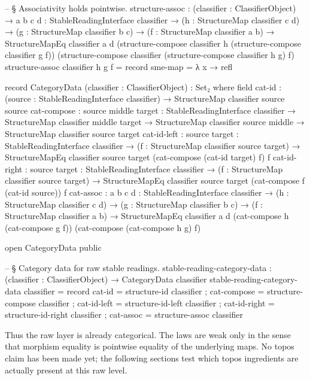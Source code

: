 \documentclass[11pt]{article}
\begin{document}
\begin{code}
-- § Associativity holds pointwise.
structure-assoc :
  (classifier : ClassifierObject) →
  {a b c d : StableReadingInterface classifier} →
  (h : StructureMap classifier c d) →
  (g : StructureMap classifier b c) →
  (f : StructureMap classifier a b) →
  StructureMapEq classifier a d
    (structure-compose classifier h (structure-compose classifier g f))
    (structure-compose classifier (structure-compose classifier h g) f)
structure-assoc classifier h g f = record { sme-map = λ x → refl }

record CategoryData (classifier : ClassifierObject) : Set₂ where
  field
    cat-id      : (source : StableReadingInterface classifier) →
                  StructureMap classifier source source
    cat-compose : {source middle target : StableReadingInterface classifier} →
                  StructureMap classifier middle target →
                  StructureMap classifier source middle →
                  StructureMap classifier source target
    cat-id-left : {source target : StableReadingInterface classifier} →
                  (f : StructureMap classifier source target) →
                  StructureMapEq classifier source target (cat-compose (cat-id target) f) f
    cat-id-right : {source target : StableReadingInterface classifier} →
                   (f : StructureMap classifier source target) →
                   StructureMapEq classifier source target (cat-compose f (cat-id source)) f
    cat-assoc   : {a b c d : StableReadingInterface classifier} →
                  (h : StructureMap classifier c d) →
                  (g : StructureMap classifier b c) →
                  (f : StructureMap classifier a b) →
                  StructureMapEq classifier a d
                    (cat-compose h (cat-compose g f))
                    (cat-compose (cat-compose h g) f)

open CategoryData public

-- § Category data for raw stable readings.
stable-reading-category-data :
  (classifier : ClassifierObject) → CategoryData classifier
stable-reading-category-data classifier = record
  { cat-id       = structure-id classifier
  ; cat-compose  = structure-compose classifier
  ; cat-id-left  = structure-id-left classifier
  ; cat-id-right = structure-id-right classifier
  ; cat-assoc    = structure-assoc classifier
  }
\end{code}

Thus the raw layer is already categorical.  The laws are weak only in
the sense that morphism equality is pointwise equality of the
underlying maps.  No topos claim has been made yet; the following
sections test which topos ingredients are actually present at this raw
level.
\end{document}
